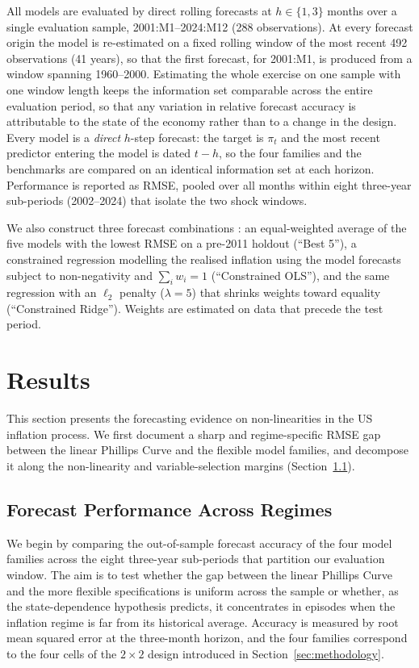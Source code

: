 \documentclass[12pt,a4paper]{article}
\begin{document}
All models are evaluated by direct rolling forecasts at $h \in \{1, 3\}$ months over a single evaluation sample, 2001:M1--2024:M12 (288 observations). At every forecast origin the model is re-estimated on a fixed rolling window of the most recent 492 observations (41 years), so that the first forecast, for 2001:M1, is produced from a window spanning 1960--2000. Estimating the whole exercise on one sample with one window length keeps the information set comparable across the entire evaluation period, so that any variation in relative forecast accuracy is attributable to the state of the economy rather than to a change in the design. Every model is a \emph{direct} $h$-step forecast: the target is $\pi_{t}$ and the most recent predictor entering the model is dated $t-h$, so the four families and the benchmarks are compared on an identical information set at each horizon. Performance is reported as RMSE, pooled over all months within eight three-year sub-periods (2002--2024) that isolate the two shock windows.

We also construct three forecast combinations \citep{batesgranger1969,timmermann2006}: an equal-weighted average of the five models with the lowest RMSE on a pre-2011 holdout (``Best 5''), a constrained regression modelling the realised inflation using the model forecasts subject to non-negativity and $\sum_i w_i = 1$ (``Constrained OLS''), and the same regression with an $\ell_2$ penalty ($\lambda=5$) that shrinks weights toward equality (``Constrained Ridge''). Weights are estimated on data that precede the test period.

\FloatBarrier
\section{Results}
\label{sec:results}

This section presents the forecasting evidence on non-linearities in the US inflation process. We first document a sharp and regime-specific RMSE gap between the linear Phillips Curve and the flexible model families, and decompose it along the non-linearity and variable-selection margins (Section~\ref{subsec:main_results}).

\subsection{Forecast Performance Across Regimes}
\label{subsec:main_results}

We begin by comparing the out-of-sample forecast accuracy of the four model families across the eight three-year sub-periods that partition our evaluation window. The aim is to test whether the gap between the linear Phillips Curve and the more flexible specifications is uniform across the sample or whether, as the state-dependence hypothesis predicts, it concentrates in episodes when the inflation regime is far from its historical average. Accuracy is measured by root mean squared error at the three-month horizon, and the four families correspond to the four cells of the $2\times 2$ design introduced in Section~\ref{sec:methodology}.
\end{document}
